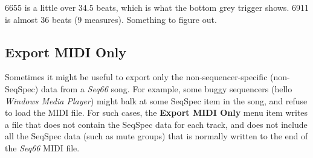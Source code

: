    6655 is a little over 34.5 beats, which is what the bottom grey trigger
   shows.
   6911 is almost 36 beats (9 measures).  Something to figure out.

\subsection{Export MIDI Only}
\label{subsec:midi_export_file_export_midi_only}

   Sometimes it might be useful to export only the non-sequencer-specific
   (non-SeqSpec) data from a \textsl{Seq66} song.
   For example, some buggy sequencers
   (hello \textsl{Windows Media Player})
   might balk at some SeqSpec item in the song, and refuse to load the MIDI
   file.
   For such cases,
   the \textbf{Export MIDI Only} menu item writes a file that does not contain
   the SeqSpec data for each track, and does not include all the SeqSpec data
   (such as mute groups) that is normally written to the end of the
   \textsl{Seq66} MIDI file.

